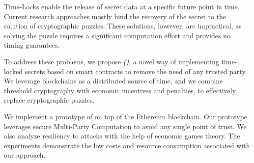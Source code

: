 Time-Locks enable the release of secret data at a specific future point in time.
Current research approaches mostly bind the recovery of the secret to the solution of cryptographic puzzles.
These solutions, however, are  impractical, as solving the puzzle requires a significant computation effort and provides no timing guarantees.

To address these problems, we propose {\em \name (\shortname)}, a novel way of implementing time-locked secrets based on smart contracts to remove the need of any trusted party.
We leverage blockchains as a distributed source of time, and we combine threshold cryptography with economic incentives and penalties, to effectively replace cryptographic puzzles.


We implement a prototype of \shortname on top of the Ethereum blockchain. 
Our prototype leverages secure Multi-Party Computation to avoid any single point of trust.
We also analyze resiliency to attacks with the help of economic games theory.
The experiments demonstrate the low costs and resource consumption associated with our approach.  
